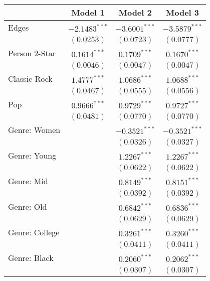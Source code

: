 
\begin{table}
\begin{center}
\begin{tabular}{l c c c}
\toprule
 & Model 1 & Model 2 & Model 3 \\
\midrule
Edges                & $-2.1483^{***}$ & $-3.6001^{***}$ & $-3.5879^{***}$ \\
                     & $(0.0253)$      & $(0.0723)$      & $(0.0777)$      \\
Person 2-Star        & $0.1614^{***}$  & $0.1709^{***}$  & $0.1670^{***}$  \\
                     & $(0.0046)$      & $(0.0047)$      & $(0.0047)$      \\
Classic Rock         & $1.4777^{***}$  & $1.0686^{***}$  & $1.0688^{***}$  \\
                     & $(0.0467)$      & $(0.0555)$      & $(0.0556)$      \\
Pop                  & $0.9666^{***}$  & $0.9729^{***}$  & $0.9727^{***}$  \\
                     & $(0.0481)$      & $(0.0770)$      & $(0.0770)$      \\
Genre: Women         &                 & $-0.3521^{***}$ & $-0.3521^{***}$ \\
                     &                 & $(0.0326)$      & $(0.0327)$      \\
Genre: Young         &                 & $1.2267^{***}$  & $1.2267^{***}$  \\
                     &                 & $(0.0622)$      & $(0.0622)$      \\
Genre: Mid           &                 & $0.8149^{***}$  & $0.8151^{***}$  \\
                     &                 & $(0.0392)$      & $(0.0392)$      \\
Genre: Old           &                 & $0.6842^{***}$  & $0.6836^{***}$  \\
                     &                 & $(0.0629)$      & $(0.0629)$      \\
Genre: College       &                 & $0.3261^{***}$  & $0.3260^{***}$  \\
                     &                 & $(0.0411)$      & $(0.0411)$      \\
Genre: Black         &                 & $0.2060^{***}$  & $0.2062^{***}$  \\
                     &                 & $(0.0307)$      & $(0.0307)$      \\

\end{tabular}
\end{center}
\end{table}
